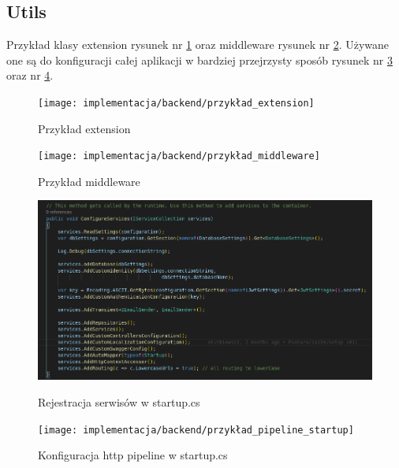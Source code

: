 \documentclass[a4paper,11pt]{report}
\begin{document}
\subsection{Utils}
Przykład klasy extension rysunek nr \ref{fig:gamitude_extension} oraz middleware rysunek nr \ref{fig:gamitude_middleware}.
Używane one są do konfiguracji całej aplikacji w bardziej przejrzysty sposób rysunek nr \ref{fig:gamitude_services_startup} oraz nr \ref{fig:gamitude_pipeline_startup}.
\begin{figure}[H]
	\centering
	\texttt{[image: implementacja/backend/przykład\_extension]}\\
	\caption{Przykład extension}
	\label{fig:gamitude_extension}
\end{figure}
\begin{figure}[H]
	\centering
	\texttt{[image: implementacja/backend/przykład\_middleware]}\\
	\caption{Przykład middleware}
	\label{fig:gamitude_middleware}
\end{figure}
\begin{figure}[H]
	\centering
	\includegraphics[scale=0.3]{implementacja/backend/register_services_startup}\\
	\caption{Rejestracja serwisów w startup.cs}
	\label{fig:gamitude_services_startup}
\end{figure}
\begin{figure}[H]
	\centering
	\texttt{[image: implementacja/backend/przykład\_pipeline\_startup]}\\
	\caption{Konfiguracja http pipeline w startup.cs}
	\label{fig:gamitude_pipeline_startup}
\end{figure}
\end{document}
